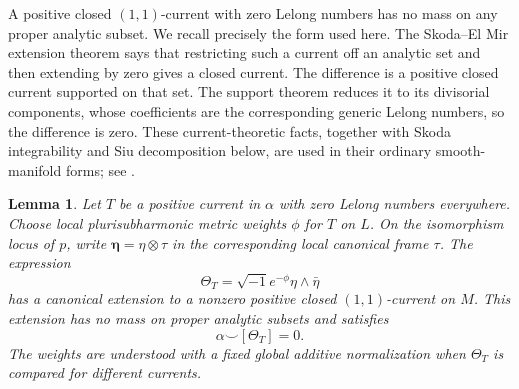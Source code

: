 \documentclass[11pt,letterpaper]{article}
\newtheorem{lemma}[theorem]{Lemma}
\theoremstyle{definition}
\theoremstyle{remark}
\begin{document}
A positive closed $(1,1)$-current with zero Lelong numbers has no mass
on any proper analytic subset.  We recall precisely the form used here.
The Skoda--El Mir extension theorem says that restricting such a current
off an analytic set and then extending by zero gives a closed current.
The difference is a positive closed current supported on that set.  The
support theorem reduces it to its divisorial components, whose
coefficients are the corresponding generic Lelong numbers, so the
difference is zero.  These current-theoretic facts, together with Skoda
integrability and Siu decomposition below, are used in their ordinary
smooth-manifold forms; see \cite{DemaillyComplexAnalyticGeometry}.

\begin{lemma}\label{fol:transverse-current}
Let $T$ be a positive current in $\alpha$ with zero Lelong numbers
everywhere.  Choose local plurisubharmonic metric weights $\phi$ for
$T$ on $L$.  On the isomorphism locus of $p$, write
$\boldsymbol\eta=\eta\otimes\tau$ in the corresponding local canonical
frame $\tau$.  The expression
\begin{equation}\label{fol:Theta-definition}
 \Theta_T=\sqrt{-1} e^{-\phi}\eta\wedge\bar\eta
\end{equation}
has a canonical extension to a nonzero positive closed $(1,1)$-current
on $M$.  This extension has no mass on proper analytic subsets and satisfies
\begin{equation}\label{fol:Theta-orthogonality}
 \alpha\smile[\Theta_T]=0.
\end{equation}
The weights are understood with a fixed global additive normalization
when $\Theta_T$ is compared for different currents.
\end{lemma}
\end{document}
